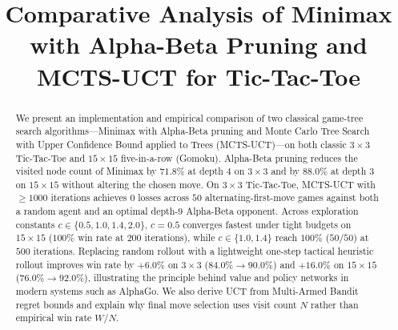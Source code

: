 \documentclass[conference]{IEEEtran}
\begin{document}
\title{Comparative Analysis of Minimax with Alpha-Beta Pruning and MCTS-UCT for Tic-Tac-Toe}

\author{
\and
{}
}


\maketitle

\begin{abstract}
We present an implementation and empirical comparison of two classical game-tree search algorithms---Minimax with Alpha-Beta pruning and Monte Carlo Tree Search with Upper Confidence Bound applied to Trees (MCTS-UCT)---on both classic $3\times 3$ Tic-Tac-Toe and $15\times 15$ five-in-a-row (Gomoku). Alpha-Beta pruning reduces the visited node count of Minimax by $71.8\%$ at depth $4$ on $3\times 3$ and by $88.0\%$ at depth $3$ on $15\times 15$ without altering the chosen move. On $3\times 3$ Tic-Tac-Toe, MCTS-UCT with $\ge 1000$ iterations achieves $0$ losses across $50$ alternating-first-move games against both a random agent and an optimal depth-$9$ Alpha-Beta opponent. Across exploration constants $c \in \{0.5, 1.0, 1.4, 2.0\}$, $c = 0.5$ converges fastest under tight budgets on $15\times 15$ ($100\%$ win rate at $200$ iterations), while $c \in \{1.0, 1.4\}$ reach $100\%$ ($50/50$) at $500$ iterations. Replacing random rollout with a lightweight one-step tactical heuristic rollout improves win rate by $+6.0\%$ on $3\times 3$ ($84.0\% \rightarrow 90.0\%$) and $+16.0\%$ on $15\times 15$ ($76.0\% \rightarrow 92.0\%$), illustrating the principle behind value and policy networks in modern systems such as AlphaGo. We also derive UCT from Multi-Armed Bandit regret bounds and explain why final move selection uses visit count $N$ rather than empirical win rate $W/N$.
\end{abstract}
\end{document}
